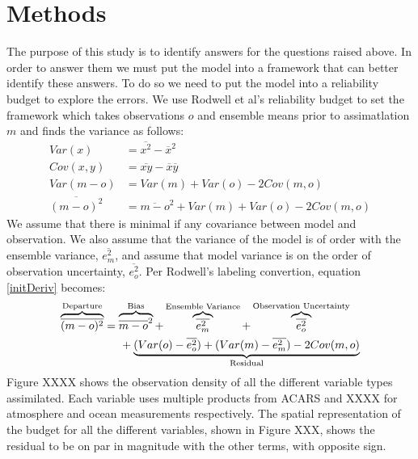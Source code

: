 \documentclass[smallextended]{svjour3}       %
\begin{document}
\section{Methods}
The purpose of this study is to identify answers for the questions raised above. In order to answer them we must put the model into a framework that can better identify these answers. To do so we need to put the model into a reliability budget to explore the errors. We use Rodwell et al's reliability budget to set the framework which takes observations $o$ and ensemble means prior to assimatlation $m$ and finds the variance as follows:\\

\begin{align}
Var(x) &= \overline{x^2} - \overline{x}^2\nonumber\\
Cov(x,y) &= \overline{xy} - \overline{x}\overline{y}\nonumber\\
Var(m - o) &= Var(m) + Var(o) - 2Cov(m, o)\nonumber\\
\overline{(m-o)^2} &= \overline{m-o}^2 + Var(m) + Var(o) -2Cov(m,o)\label{initDeriv}
\end{align}
We assume that there is minimal if any covariance between model and observation. We also assume that the variance of the model is of order with the ensemble variance, $\overline{e_m^2}$, and assume that model variance is on the order of observation uncertainty, $\overline{e_o^2}$. Per Rodwell's labeling convertion, equation \ref{initDeriv} becomes:
\begin{align}
\overbrace{\overline{(m-o)^2}}^\text{Departure} &= \overbrace{\overline{m-o}^2}^\text{Bias} +\overbrace{\overline{e_m^2}}^\text{Ensemble Variance}+ \overbrace{\overline{e_o^2}}^\text{Observation Uncertainty} \nonumber\\
&\hspace{5mm} + \underbrace{(Var(o) - \overline{e_o^2}) + (Var(m) - \overline{e_m^2}) - 2Cov(m,o)}_\text{Residual}\label{relBudj}
\end{align}
Figure XXXX shows the observation density of all the different variable types assimilated. Each variable uses multiple products from ACARS and XXXX for atmosphere and ocean measurements respectively. The spatial representation of the budget for all the different variables, shown in Figure XXX, shows the residual to be on par in magnitude with the other terms, with opposite sign. 
\end{document}
